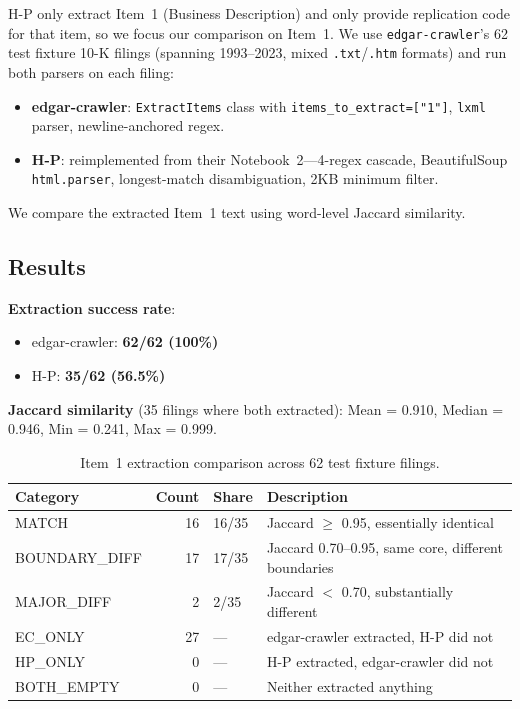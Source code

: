 \documentclass[11pt]{article}
\begin{document}
H-P only extract Item~1 (Business Description) and only provide replication code
for that item, so we focus our comparison on Item~1. We use
\texttt{edgar-crawler}'s 62 test fixture 10-K filings (spanning 1993--2023, mixed
\texttt{.txt}/\texttt{.htm} formats) and run both parsers on each filing:

\begin{itemize}
  \item \textbf{edgar-crawler}: \texttt{ExtractItems} class with
    \texttt{items\_to\_extract=["1"]}, \texttt{lxml} parser, newline-anchored
    regex.
  \item \textbf{H-P}: reimplemented from their Notebook~2---4-regex cascade,
    BeautifulSoup \texttt{html.parser}, longest-match disambiguation, 2KB minimum
    filter.
\end{itemize}

We compare the extracted Item~1 text using word-level Jaccard similarity.

\subsection{Results}

\textbf{Extraction success rate}:
\begin{itemize}
  \item edgar-crawler: \textbf{62/62 (100\%)}
  \item H-P: \textbf{35/62 (56.5\%)}
\end{itemize}

\textbf{Jaccard similarity} (35 filings where both extracted):
Mean = 0.910, Median = 0.946, Min = 0.241, Max = 0.999.

\begin{table}[h]
\centering
\begin{tabular}{lrll}
\toprule
Category & Count & Share & Description \\
\midrule
MATCH          & 16 & 16/35 & Jaccard $\geq$ 0.95, essentially identical \\
BOUNDARY\_DIFF & 17 & 17/35 & Jaccard 0.70--0.95, same core, different boundaries \\
MAJOR\_DIFF    & 2  & 2/35  & Jaccard $<$ 0.70, substantially different \\
EC\_ONLY       & 27 & ---   & edgar-crawler extracted, H-P did not \\
HP\_ONLY       & 0  & ---   & H-P extracted, edgar-crawler did not \\
BOTH\_EMPTY    & 0  & ---   & Neither extracted anything \\
\bottomrule
\end{tabular}
\caption{Item~1 extraction comparison across 62 test fixture filings.}
\end{table}
\end{document}
